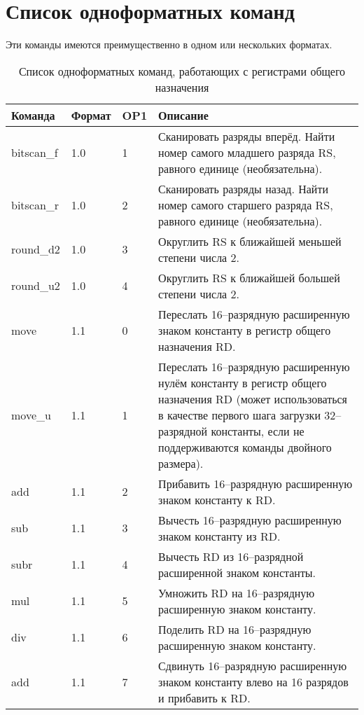 \documentclass[forwardcom.tex]{subfiles}
\begin{document}
\section{Список одноформатных команд}
Эти команды имеются преимущественно в одном или нескольких форматах.

\begin{longtable} {|p{23mm}|p{15mm}|p{9mm}|p{99mm}|}
\caption{Список одноформатных команд, работающих с регистрами общего назначения} 
\label{table:ListOfSingleFormatInstructionsGP} \\
\endfirsthead
\endhead
\hline
\bfseries Команда & \bfseries Формат &\bfseries OP1 & \bfseries Описание \\ \hline
bitscan\_f        & 1.0   &  1 & Сканировать разряды вперёд. Найти номер самого младшего разряда RS, равного единице (необязательна). \\
bitscan\_r        & 1.0   &  2 & Сканировать разряды назад. Найти номер самого старшего разряда RS, равного единице (необязательна).  \\
round\_d2         & 1.0   &  3 & Округлить RS к ближайшей меньшей степени числа 2.                                                    \\
round\_u2         & 1.0   &  4 & Округлить RS к ближайшей большей степени числа 2.                                                    \\
move              & 1.1   &  0 & Переслать 16--разрядную расширенную знаком константу в регистр общего назначения RD.                 \\
move\_u           & 1.1   &  1 & Переслать 16--разрядную расширенную нулём константу в регистр общего назначения RD (может использоваться в качестве первого шага загрузки 32--разрядной константы, если не поддерживаются команды двойного размера). \\
add               & 1.1   &  2 & Прибавить 16--разрядную расширенную знаком константу к RD. \\
sub               & 1.1   &  3 & Вычесть 16--разрядную расширенную знаком константу из RD.  \\
subr              & 1.1   &  4 & Вычесть RD из 16--разрядной расширенной знаком константы.  \\
mul               & 1.1   &  5 & Умножить RD на 16--разрядную расширенную знаком константу. \\
div               & 1.1   &  6 & Поделить RD на 16--разрядную расширенную знаком константу. \\
add               & 1.1   &  7 & Сдвинуть  16--разрядную расширенную знаком константу влево на 16 разрядов и прибавить к RD. \\

\end{longtable}
\end{document}
